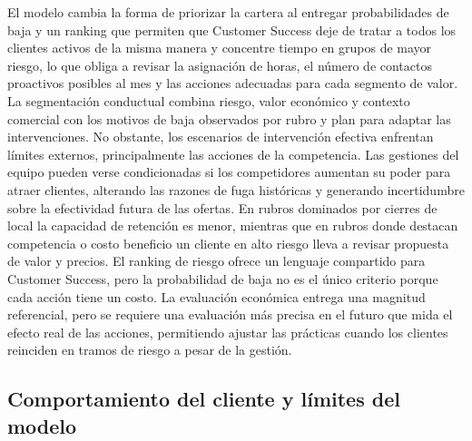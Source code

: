 El modelo cambia la forma de priorizar la cartera al entregar probabilidades de baja y un ranking que permiten que Customer Success deje de tratar a todos los clientes activos de la misma manera y concentre tiempo en grupos de mayor riesgo, lo que obliga a revisar la asignación de horas, el número de contactos proactivos posibles al mes y las acciones adecuadas para cada segmento de valor. La segmentación conductual combina riesgo, valor económico y contexto comercial con los motivos de baja observados por rubro y plan para adaptar las intervenciones. No obstante, los escenarios de intervención efectiva enfrentan límites externos, principalmente las acciones de la competencia. Las gestiones del equipo pueden verse condicionadas si los competidores aumentan su poder para atraer clientes, alterando las razones de fuga históricas y generando incertidumbre sobre la efectividad futura de las ofertas. En rubros dominados por cierres de local la capacidad de retención es menor, mientras que en rubros donde destacan competencia o costo beneficio un cliente en alto riesgo lleva a revisar propuesta de valor y precios. El ranking de riesgo ofrece un lenguaje compartido para Customer Success, pero la probabilidad de baja no es el único criterio porque cada acción tiene un costo. La evaluación económica entrega una magnitud referencial, pero se requiere una evaluación más precisa en el futuro que mida el efecto real de las acciones, permitiendo ajustar las prácticas cuando los clientes reinciden en tramos de riesgo a pesar de la gestión.

\subsection{Comportamiento del cliente y límites del modelo}

